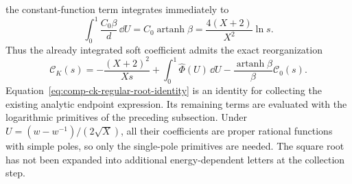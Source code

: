 the constant-function term integrates immediately to
\begin{equation}
 \int_0^1\frac{C_0\beta}{d}\,\dd U
 =C_0\operatorname{artanh}\beta
 =\frac{4(X+2)}{X^2}\ln s.
\end{equation}
Thus the already integrated soft coefficient admits the exact
reorganization
\begin{equation}
 \mathcal C_K(s)=-\frac{(X+2)^2}{Xs}
 +\int_0^1\widehat\Phi(U)\,\dd U
 -\frac{\operatorname{artanh}\beta}{\beta}\mathcal C_0(s).
\label{eq:comp-ck-regular-root-identity}
\end{equation}
Equation~\eqref{eq:comp-ck-regular-root-identity} is an identity for
collecting the existing analytic endpoint expression. Its remaining
terms are evaluated with the logarithmic primitives of the preceding
subsection. Under $U=(w-w^{-1})/(2\sqrt X)$, all their coefficients
are proper rational functions with simple poles, so only the single-pole
primitives are needed. The square root has not been expanded into
additional energy-dependent letters at the collection step.


